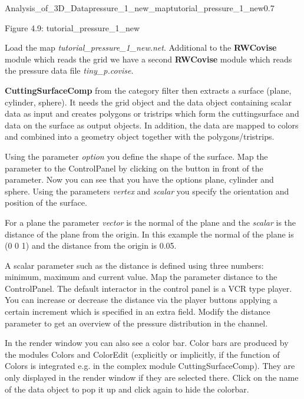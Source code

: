 \begin{covimg}{Analysis_of_3D_Data}{pressure_1_new_map}{tutorial\_pressure\_1\_new}{0.7}\end{covimg}
\begin{htmlonly}
Figure 4.9: tutorial_pressure_1_new
\vspace{1cm}
\end{htmlonly}

Load the map {\it tutorial\_pressure\_1\_new.net}. Additional to the {\bf RWCovise} module 
which reads the grid we have a second {\bf RWCovise} module which reads the pressure 
data file {\it tiny\_p.covise}. 

{\bf CuttingSurfaceComp} from the category filter then extracts a surface (plane, cylinder, 
sphere). It needs the grid object and the data object containing scalar data as input 
and creates polygons or tristrips which form the cuttingsurface and data on the surface 
as output objects. In addition, the data are mapped to colors and combined into a geometry object together with the 
polygons/tristrips. 

Using the parameter \emph{option} you define the shape of the surface. Map
the parameter to the ControlPanel by clicking on the button in front of the parameter. 
Now you can see that you have the options plane, cylinder and sphere. Using the 
parameters \emph{vertex} and \emph{scalar} you specify the orientation and position 
of the surface.

For a plane the parameter \emph{vector} is the normal of the plane and the \emph{scalar}
is the distance of the plane from the origin. In this example the normal of the plane 
is (0 0 1) and the distance from the origin is 0.05.

A scalar parameter such as the distance is defined using three numbers: minimum, maximum
and current value. Map the parameter distance to the ControlPanel. The default 
interactor in the control panel is a VCR type player. You can increase or decrease the 
distance via the player buttons applying a certain increment which is specified in an 
extra field. Modify the distance parameter to get an overview of the pressure 
distribution in the channel. 


In the render window you can also see a color bar. Color bars are produced by the 
modules Colors and ColorEdit (explicitly or implicitly, if the function of Colors is integrated
e.g. in the complex module CuttingSurfaceComp). They are only displayed in the render window if they 
are selected there. Click on the name of the data object to pop it up and click 
again to hide the colorbar.

